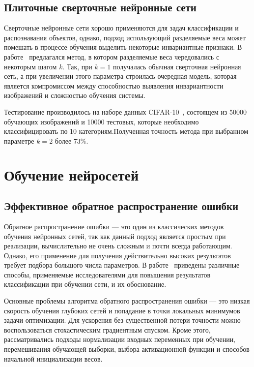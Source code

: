 \documentclass[a4paper,14pt]{extarticle} %
\begin{document}
\subsection{Плиточные сверточные нейронные сети}
\hspace{\parindent} Сверточные нейронные сети хорошо применяются для задач классификации и распознавания объектов, однако, подход использующий разделяемые веса может помешать в процессе обучения выделить некоторые инвариантные признаки. В работе~\cite{ngiam2010tiled} предлагался метод, в котором разделяемые веса чередовались с некоторым шагом $k$. Так, при $k=1$ получалась обычная сверточная нейронная сеть, а при увеличении этого параметра строилась очередная модель, которая является компромиссом между способностью выявления инвариантности изображений и сложностью обучения системы.

Тестирование производилось на наборе данных CIFAR-10~\cite{krizhevsky2009learning}, состоящем из 50000 обучающих изображений и 10000 тестовых, которые необходимо классифицировать по 10 категориям.Полученная точность метода при выбранном параметре $k=2$ более 73\%.

\section{Обучение нейросетей}

\subsection{Эффективное обратное распространение ошибки}
\hspace{\parindent} Обратное распространение ошибки --- это один из классических методов обучения нейронных сетей, так как данный подход является простым при реализации, вычислительно не очень сложным и почти всегда работающим. Однако, его применение для получения действительно высоких результатов требует подбора большого числа параметров. В работе~\cite{lecun2012efficient} приведены различные способы, применяемые исследователями для повышения результатов классификации при обучении сети, и их обоснование.

Основные проблемы алгоритма обратного распространения ошибки --- это низкая скорость обучения глубоких сетей и попадание в точки локальных минимумов задачи оптимизации. Для ускорения без существенной потери точности можно воспользоваться стохастическим градиентным спуском. Кроме этого, рассматривались подходы нормализации входных переменных при обучении, перемешивания обучающей выборки, выбора активационной функции и способов начальной инициализации весов.
\end{document}
